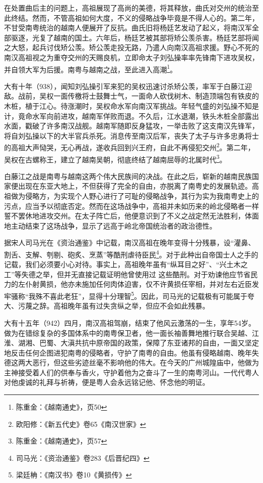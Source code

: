 在处置曲后主的问题上，高祖展现了高尚的美德，将其释放，曲氏对交州的统治至此终结。然而，不管高祖如何大度，不义的侵略战争毕竟是不得人心的。第二年，不甘受南粤统治的越南人便展开了反抗。曲氏旧将杨廷艺发动了起义，将南汉军全部驱逐，光复了越南的国土。六年后，杨廷艺被其部将矫公羡杀害。杨廷艺部将闻之大怒，起兵讨伐矫公羡。矫公羡走投无路，乃遣人向南汉高祖求援。野心不死的南汉高祖视之为重夺交州的天赐良机，立即命太子刘弘操率率先锋南下进攻吴权，并自领大军为后援。南粤与越南之战，至此进入高潮\footnote{陈重金：《越南通史》，页50}。

大有十年（938），闻知刘弘操引军来犯的吴权迅速讨杀矫公羡，率军于白藤江迎敌。战前，吴权一面传檄将士鼓舞士气，一面命人砍伐树木、制造顶端包有铁皮的木桩，植于江心。待涨潮时，吴权命水军向南汉军挑战。年轻气盛的刘弘操不知是计，竟命水军向前进攻，越南军佯败而退。不久后，江水退潮，铁头木桩全部露出水面，戳破了许多南汉战舰。越南军随即反身猛攻，一举击败了这支南汉先锋军，将自刘弘操以下的大半官兵杀死。消息传至南汉后军，丧失了太子与许多忠勇将士的高祖大声恸哭，无心再战，遂收兵回到兴王府，自此不再侵犯交州\footnote{欧阳修：《新五代史》卷65《南汉世家》}。第二年，吴权在古螺称王，建立了越南吴朝，彻底终结了越南屈辱的北属时代\footnote{陈重金：《越南通史》，页57}。

白藤江之战是南粤与越南这两个伟大民族间的决战。在此之后，崭新的越南民族国家便出现在东亚大地上，不但获得了完全的自由，亦脱离了南粤史的发展轨迹。高祖做为侵略方，为实现个人野心进行了可耻的侵略战争，其行为实为我南粤史上的污点，应当予以彻底否定。然而在这场战争中，高祖并未如历来的岭北侵略者一样誓不罢休地进攻交州。在太子阵亡后，他便意识到了不义之战定然无法胜利，体面地主动结束了这场战争，显示了远高于岭北帝国统治者的政治德性。

据宋人司马光在《资治通鉴》中记载，南汉高祖在晚年变得十分残暴，设“灌鼻、割舌、支解、刳剔、砲炙、烹蒸”等酷刑虐待臣民\footnote{司马光：《资治通鉴》卷283《后晋纪四》}。对于此种出自帝国士人之手的记载，我们必须要小心对待。事实上，高祖晚年虽有“纵耳目之好”、“兴土木之工”等失德之举，但并无直接记载证明他曾使用过 这些酷刑。对于劝谏他应节省民力的左仆射黄损，他亦未施加任何肉体迫害，仅不许黄损任宰相，并对左右近臣发牢骚称“我殊不喜此老狂”，显得十分理智\footnote{梁廷柟：《南汉书》卷10《黄损传》}。因此，司马光的记载极有可能属于夸大、污蔑之辞。高祖晚年虽有过失贪纵之举，但应不会如此残暴。

大有十五年（942）四月，南汉高祖驾崩，结束了他风云激荡的一生，享年54岁。做为在错综复杂的多国体系中的南粤保卫者，他一面长袖善舞地推行联合吴越、江淮、湖湘、巴蜀、大滇共抗中原帝国的政策，保障了东亚诸邦的自由，一面又坚定地反击任何企图进犯南粤的侵略者，守护了南粤的自由。他虽有侵略越南、晚年失德这两大恶行，但这些劣迹丝毫不影响他的伟大。在今天的广州城隍庙中，他做为主神接受着人们的供奉与香火，守护着他为之奋斗了一生的南粤河山。一代代粤人对他虔诚的礼拜与祈祷，便是粤人会永远铭记他、怀念他的明证。

